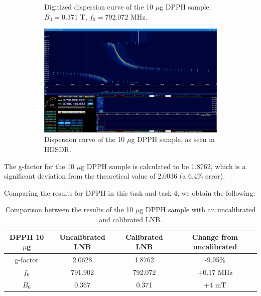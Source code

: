 \documentclass{article}
\begin{document}
\begin{figure}[h]
	\centering
	\begin{subfigure}[t]{0.45\textwidth}
		\centering
		\scalebox{0.45}{}
		\caption{Digitized dispersion curve of the 10 $\mu$g DPPH sample. $B_0 = 0.371$ T, $f_0 = 792.072$ MHz.}
		\label{fig:DPPH10mgDigitizedCalibrated}
	\end{subfigure}
	\hfill
	\begin{subfigure}[t]{0.45\textwidth}
		\centering
		\includegraphics[width=\textwidth]{Figures/Task 6/DPPH10mgCalibrated.png}
		\caption{Dispersion curve of the 10 $\mu$g DPPH sample, as seen in HDSDR.}
		\label{fig:DPPH10mgCalibrated}
	\end{subfigure}
	\caption{}
	\label{fig:DPPHCalibrated}
\end{figure}

The g-factor for the 10 $\mu$g DPPH sample is calculated to be 1.8762, which is a significant deviation from the theoretical value of 2.0036 (a 6.4\% error).	

Comparing the results for DPPH in this task and task 4, we obtain the following:

\begin{table}[h]
	\centering
	\begin{tabular}{|c|c|c|c|}
	\hline
	DPPH 10 $\mu$g & Uncalibrated LNB & Calibrated LNB & Change from uncalibrated \\ \hline
g-factor       & 2.0628           & 1.8762         & -9.95\%                  \\ \hline
$f_0$          & 791.902          & 792.072        & +0.17 MHz                \\ \hline
$B_0$          & 0.367            & 0.371          & +4 mT                    \\ \hline
	\end{tabular}
	\caption{Comparison between the results of the 10 $\mu$g DPPH sample with an uncalibrated and calibrated LNB.}
\end{table}
\end{document}
